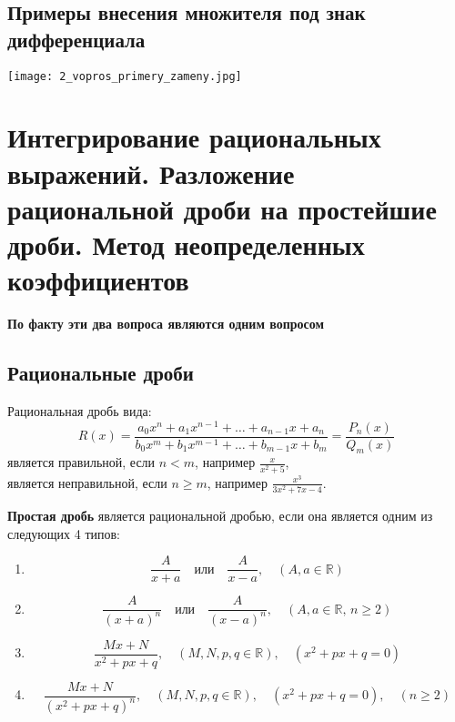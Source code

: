 \documentclass[a4paper,12pt]{article}
\begin{document}
\subsection{Примеры внесения множителя под знак дифференциала}
\texttt{[image: 2\_vopros\_primery\_zameny.jpg]}

\section{Интегрирование рациональных выражений. Разложение рациональной дроби на простейшие дроби. Метод неопределенных коэффициентов}

\textbf{По факту эти два вопроса являются одним вопросом}

\subsection{Рациональные дроби}
Рациональная дробь вида:
\[
R(x) = \frac{a_0x^n + a_1x^{n-1} + \dots + a_{n-1}x + a_n}{b_0x^m + b_1x^{m-1} + \dots + b_{m-1}x + b_m} = \frac{P_n(x)}{Q_m(x)}
\]
является правильной, если \( n < m \), например \(\frac{x}{x^2 + 5}\),\\
является неправильной, если \( n \geq m \), например \(\frac{x^3}{3x^2 + 7x - 4}\).

\textbf{Простая дробь} является рациональной дробью, если она является одним из следующих 4 типов:
\begin{enumerate}
    \item \[
    \frac{A}{x + a} \quad \text{или} \quad \frac{A}{x - a}, \quad (A, a \in \mathbb{R})
    \]
    \item \[
    \frac{A}{(x + a)^n} \quad \text{или} \quad \frac{A}{(x - a)^n}, \quad (A, a \in \mathbb{R}, \, n \geq 2)
    \]
    \item \[
    \frac{Mx + N}{x^2 + px + q}, \quad (M, N, p, q \in \mathbb{R}), \quad (x^2 + px + q = 0)
    \]
    \item \[
    \frac{Mx + N}{(x^2 + px + q)^n}, \quad (M, N, p, q \in \mathbb{R}), \quad (x^2 + px + q = 0), \quad (n \geq 2)
    \]
\end{enumerate}
\end{document}
